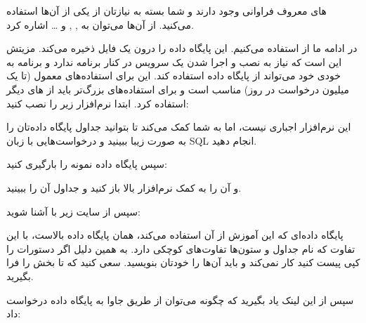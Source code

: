 \documentclass[]{article}
\begin{document}
 های معروف فراوانی وجود دارند و شما بسته به نیازتان از یکی از آن‌ها استفاده می‌کنید. از آن‌ها می‌توان به , ,  و … اشاره کرد.


در ادامه ما از  استفاده می‌کنیم. این  پایگاه داده را درون یک فایل ذخیره می‌کند. مزیتش این است که نیاز به نصب و اجرا شدن یک سرویس در کنار برنامه ندارد و برنامه به خودی خود می‌تواند از پایگاه داده استفاده کند. این  برای استفاده‌های معمول (تا یک میلیون درخواست در روز) مناسب است و برای استفاده‌های بزرگ‌تر باید از  های دیگر استفاده کرد.
\newpage
ابتدا نرم‌افزار زیر را نصب کنید:

\begin{flushleft}
\href{https://sqlitebrowser.org/dl/}{\textcolor{blue}{\underline{}}}	 	 	 	

\end{flushleft}


این نرم‌افزار اجباری نیست، اما به شما کمک می‌کند تا بتوانید جداول پایگاه داده‌تان را به صورت زیبا ببینید و درخواست‌هایی با زبان SQL انجام دهید.

سپس پایگاه داده نمونه  را بارگیری کنید:

\begin{flushleft}
\href{https://github.com/jpwhite3/northwind-SQLite3/blob/master/Northwind_small.sqlite}{\textcolor{blue}{\underline{}}}

\end{flushleft}

و آن را به کمک نرم‌افزار بالا باز کنید و جداول آن را ببینید.

سپس از سایت زیر با  آشنا شوید:
\begin{flushleft}
\href{https://www.w3schools.com/sql/sql_select.asp}{\textcolor{blue}{\underline{}}}

\end{flushleft}

پایگاه داده‌ای که این آموزش از آن استفاده می‌کند، همان پایگاه داده بالاست، با این تفاوت که نام جداول و ستون‌ها تفاوت‌های کوچکی دارد. به همین دلیل اگر دستورات را کپی پیست کنید کار نمی‌کند و باید آن‌ها را خودتان بنویسید. سعی کنید که تا بخش  را فرا بگیرید.

سپس از این لینک یاد بگیرید که چگونه می‌توان از طریق جاوا به پایگاه داده درخواست داد:

\begin{flushleft}
\href{https://en.wikipedia.org/wiki/Apache_Maven}{\textcolor{blue}{\underline{}}}

\end{flushleft}
\end{document}
